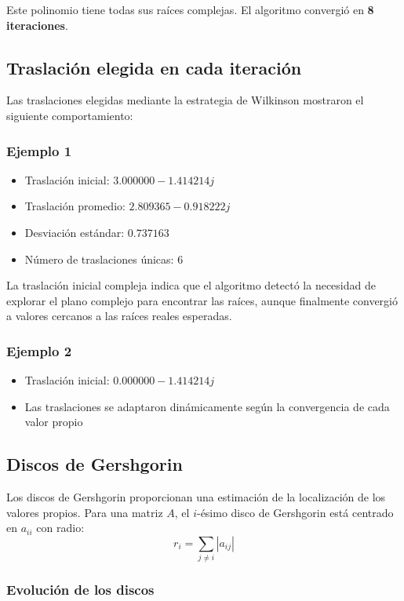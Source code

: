 \documentclass[12pt]{article}
\begin{document}
Este polinomio tiene todas sus raíces complejas. El algoritmo convergió en \textbf{8 iteraciones}.

\subsection{Traslación elegida en cada iteración}

Las traslaciones elegidas mediante la estrategia de Wilkinson mostraron el siguiente comportamiento:

\subsubsection{Ejemplo 1}
\begin{itemize}
    \item Traslación inicial: $3.000000 - 1.414214j$
    \item Traslación promedio: $2.809365 - 0.918222j$
    \item Desviación estándar: $0.737163$
    \item Número de traslaciones únicas: 6
\end{itemize}

La traslación inicial compleja indica que el algoritmo detectó la necesidad de explorar el plano complejo para encontrar las raíces, aunque finalmente convergió a valores cercanos a las raíces reales esperadas.

\subsubsection{Ejemplo 2}
\begin{itemize}
    \item Traslación inicial: $0.000000 - 1.414214j$
    \item Las traslaciones se adaptaron dinámicamente según la convergencia de cada valor propio
\end{itemize}

\subsection{Discos de Gershgorin}

Los discos de Gershgorin proporcionan una estimación de la localización de los valores propios. Para una matriz $A$, el $i$-ésimo disco de Gershgorin está centrado en $a_{ii}$ con radio:
\[
r_i = \sum_{j \neq i} |a_{ij}|
\]

\subsubsection{Evolución de los discos}
\end{document}
